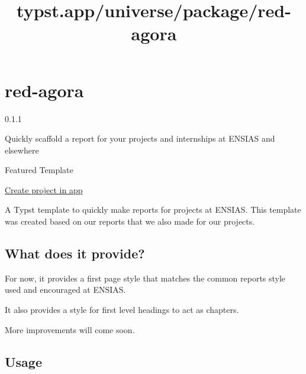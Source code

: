 \title{typst.app/universe/package/red-agora}

\label{banner}
\label{template-thumbnail}

\section{red-agora}\label{red-agora}

{ 0.1.1 }

Quickly scaffold a report for your projects and internships at ENSIAS
and elsewhere

{ } Featured Template

\href{/app?template=red-agora&version=0.1.1}{Create project in app}

\label{readme}
A Typst template to quickly make reports for projects at ENSIAS. This
template was created based on our reports that we also made for our
projects.

\subsection{What does it provide?}\label{what-does-it-provide}

For now, it provides a first page style that matches the common reports
style used and encouraged at ENSIAS.

It also provides a style for first level headings to act as chapters.

More improvements will come soon.

\subsection{Usage}\label{usage}

